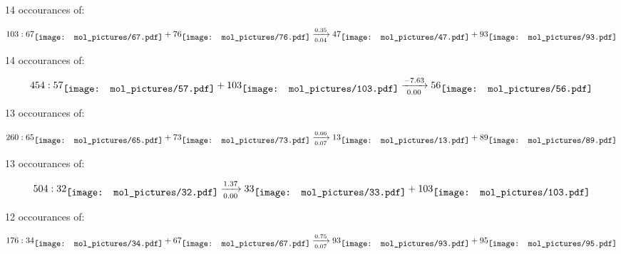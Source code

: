\documentclass{article}
\begin{document}
\vspace{1cm}


14 occourances of:

$$
103:  
67
\raisebox{-.5\height}{\texttt{[image: mol\_pictures/67.pdf]}}
+
76
\raisebox{-.5\height}{\texttt{[image: mol\_pictures/76.pdf]}}
\xrightarrow[0.04]{0.35}
47
\raisebox{-.5\height}{\texttt{[image: mol\_pictures/47.pdf]}}
+
93
\raisebox{-.5\height}{\texttt{[image: mol\_pictures/93.pdf]}}
$$



\vspace{1cm}


14 occourances of:

$$
454:  
57
\raisebox{-.5\height}{\texttt{[image: mol\_pictures/57.pdf]}}
+
103
\raisebox{-.5\height}{\texttt{[image: mol\_pictures/103.pdf]}}
\xrightarrow[0.00]{-7.63}
56
\raisebox{-.5\height}{\texttt{[image: mol\_pictures/56.pdf]}}
$$



\vspace{1cm}


13 occourances of:

$$
260:  
65
\raisebox{-.5\height}{\texttt{[image: mol\_pictures/65.pdf]}}
+
73
\raisebox{-.5\height}{\texttt{[image: mol\_pictures/73.pdf]}}
\xrightarrow[0.07]{0.66}
13
\raisebox{-.5\height}{\texttt{[image: mol\_pictures/13.pdf]}}
+
89
\raisebox{-.5\height}{\texttt{[image: mol\_pictures/89.pdf]}}
$$



\vspace{1cm}


13 occourances of:

$$
504:  
32
\raisebox{-.5\height}{\texttt{[image: mol\_pictures/32.pdf]}}
\xrightarrow[0.00]{1.37}
33
\raisebox{-.5\height}{\texttt{[image: mol\_pictures/33.pdf]}}
+
103
\raisebox{-.5\height}{\texttt{[image: mol\_pictures/103.pdf]}}
$$



\vspace{1cm}


12 occourances of:

$$
176:  
34
\raisebox{-.5\height}{\texttt{[image: mol\_pictures/34.pdf]}}
+
67
\raisebox{-.5\height}{\texttt{[image: mol\_pictures/67.pdf]}}
\xrightarrow[0.07]{0.75}
93
\raisebox{-.5\height}{\texttt{[image: mol\_pictures/93.pdf]}}
+
95
\raisebox{-.5\height}{\texttt{[image: mol\_pictures/95.pdf]}}
$$
\end{document}
